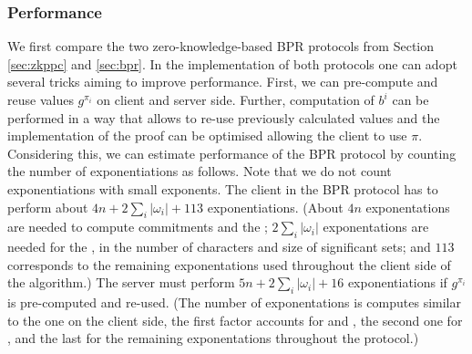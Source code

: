 \subsubsection{Performance}
We first compare the two zero-knowledge-based \ac{BPR} protocols from Section \ref{sec:zkppc} and \ref{sec:bpr}.
In the implementation of both protocols one can adopt several tricks aiming to improve performance. 
First, we can pre-compute and reuse values $g^{\pi_i}$ on client and server side.
Further, computation of $b^i$ can be performed in a way that allows to re-use previously calculated values and the implementation of the proof can be optimised allowing the client to use $\pi$.
Considering this, we can estimate performance of the \ac{BPR} protocol by counting the number of exponentiations as follows.
Note that we do not count exponentiations with small exponents.
%
The client in the \ac{BPR} protocol has to perform about $4n+2\sum_i |\omega_i| + 113$ exponentiations.
(About $4n$ exponentations are needed to compute commitments and the \PoS; $2\sum_i |\omega_i|$ exponentations are needed for the \PoM, \ie in the number of characters and size of significant sets; and $113$ corresponds to the remaining exponentations used throughout the client side of the algorithm.)
The server must perform $5n + 2\sum_i |\omega_i| + 16$ exponentiations if $g^{\pi_i}$ is pre-computed and re-used.
(The number of exponentations is computes similar to the one on the client side, \ie the first factor accounts for \PoS and \PoE, the second one for \PoM, and the last for the remaining exponentations throughout the protocol.)
